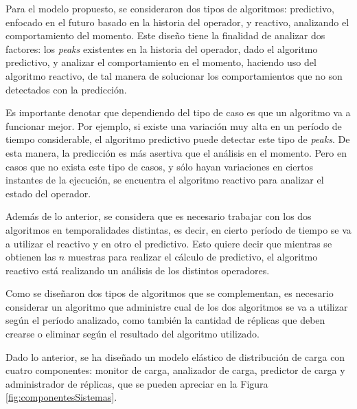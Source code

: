 Para el modelo propuesto, se consideraron dos tipos de algoritmos: predictivo, enfocado en el futuro basado en la historia del operador, y reactivo, analizando el comportamiento del momento. Este diseño tiene la finalidad de analizar dos factores: los \textit{peaks} existentes en la historia del operador, dado el algoritmo predictivo, y analizar el comportamiento en el momento, haciendo uso del algoritmo reactivo, de tal manera de solucionar los comportamientos que no son detectados con la predicción.

Es importante denotar que dependiendo del tipo de caso es que un algoritmo va a funcionar mejor. Por ejemplo, si existe una variación muy alta en un período de tiempo considerable, el algoritmo predictivo puede detectar este tipo de \textit{peaks}. De esta manera, la predicción es más asertiva que el análisis en el momento. Pero en casos que no exista este tipo de casos, y sólo hayan variaciones en ciertos instantes de la ejecución, se encuentra el algoritmo reactivo para analizar el estado del operador.

Además de lo anterior, se considera que es necesario trabajar con los dos algoritmos en temporalidades distintas, es decir, en cierto período de tiempo se va a utilizar el reactivo y en otro el predictivo. Esto quiere decir que mientras se obtienen las $n$ muestras para realizar el cálculo de predictivo, el algoritmo reactivo está realizando un análisis de los distintos operadores.


Como se diseñaron dos tipos de algoritmos que se complementan, es necesario considerar un algoritmo que administre cual de los dos algoritmos se va a utilizar según el período analizado, como también la cantidad de réplicas que deben crearse o eliminar según el resultado del algoritmo utilizado.

Dado lo anterior, se ha diseñado un modelo elástico de distribución de carga con cuatro componentes: monitor de carga, analizador de carga, predictor de carga y administrador de réplicas, que se pueden apreciar en la Figura \ref{fig:componentesSistemas}.

